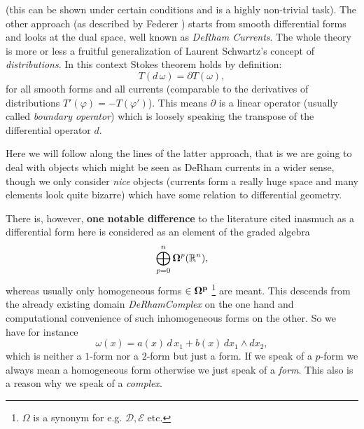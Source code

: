 \documentclass[12pt,a4paper]{article}
\newcommand{\RR}[1]{\mathbb{R}^{#1}}
\begin{document}
(this can be shown under certain conditions and is a highly non-trivial
task). The other approach (as described by Federer \cite{GMT}) starts
from smooth differential forms and looks at the dual space, well known
as {\em DeRham Currents}. The whole theory is more or less a fruitful
generalization of Laurent Schwartz's concept of {\em distributions}.
In this context Stokes theorem holds by definition:
\begin{displaymath}
      T(d\,\omega) = \partial T (\omega),
\end{displaymath}
for all smooth forms and all currents (comparable to the derivatives
of distributions $T'(\varphi)=-T(\varphi')$). This means $\partial$ is
a linear operator (usually called {\em boundary operator}) which is
loosely speaking the transpose of the differential operator $d$.

Here we will follow along the lines of the latter approach, that is we
are going to deal with objects which might be seen as DeRham currents
in a wider sense, though we only consider {\em nice} objects (currents
form a really huge space and many elements look quite bizarre) which
have some relation to differential geometry.

There is, however, {\bf one notable difference} to the literature cited 
inasmuch as a differential form here is considered as an element of 
the graded algebra
\begin{displaymath}
  \bigoplus_{p=0}^n {\bf\Omega}^p(\RR n),
\end{displaymath}
whereas usually only homogeneous forms $\in\bf\Omega^p$
\footnote{$\Omega$ is a synonym for e.g. $\mathcal{D,E}$ etc.} 
are meant. This descends from the already existing domain 
{\em DeRhamComplex} on the one hand and computational convenience of 
such inhomogeneous forms on the other. So we have for instance
\begin{displaymath}
   \omega(x) = a(x)\,d\,x_1+b(x)\, dx_1\wedge dx_2,
\end{displaymath} 
which is neither a $1$-form nor a $2$-form but just a form. If we 
speak of a $p$-form we always mean a homogeneous form otherwise we
just speak of a {\em form}. This also is a reason why we speak of
a {\em complex}.
%
\end{document}
